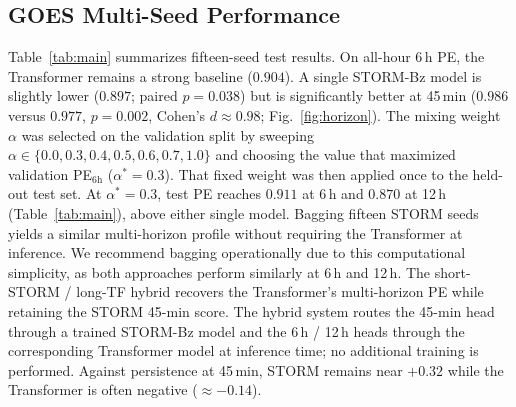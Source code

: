 \documentclass[conference]{IEEEtran}
\begin{document}
\subsection{GOES Multi-Seed Performance}
Table~\ref{tab:main} summarizes fifteen-seed test results. On all-hour 6\,h PE, the Transformer remains a strong baseline
(\(0.904\)). A single STORM-Bz model is slightly lower (\(0.897\);
paired \(p = 0.038\)) but is significantly better at 45\,min
(\(0.986\) versus \(0.977\), \(p = 0.002\), Cohen's \(d\approx0.98\); Fig.~\ref{fig:horizon}).
The mixing weight \(\alpha\) was selected on the validation split by
sweeping \(\alpha\in\{0.0, 0.3, 0.4, 0.5, 0.6, 0.7, 1.0\}\) and choosing the value that
maximized validation PE\(_{6\mathrm{h}}\) (\(\alpha^*=0.3\)). That fixed
weight was then applied once to the held-out test set. At \(\alpha^*=0.3\),
test PE reaches \(0.911\) at 6\,h and \(0.870\) at 12\,h
(Table~\ref{tab:main}), above either single model. Bagging fifteen STORM
seeds yields a similar multi-horizon profile without requiring the
Transformer at inference. We recommend bagging operationally due to this computational simplicity, as both approaches perform similarly at 6\,h and 12\,h. The short-STORM / long-TF hybrid recovers the
Transformer's multi-horizon PE while retaining the STORM 45-min score.
The hybrid system routes the 45-min head through a trained STORM-Bz model
and the 6\,h / 12\,h heads through the corresponding Transformer model at
inference time; no additional training is performed.
Against persistence at 45\,min, STORM remains near \(+0.32\) while
the Transformer is often negative (\(\approx-0.14\)).
\end{document}
